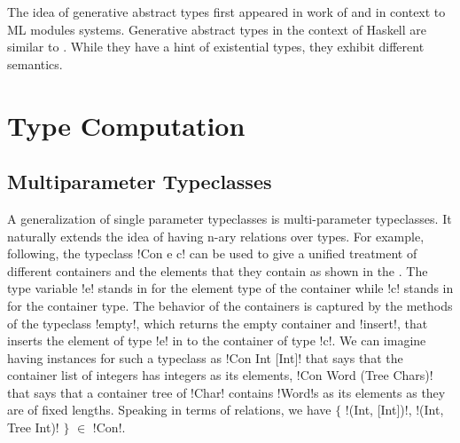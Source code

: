 \documentclass[screen,nonacm,manuscript,review]{acmart} %
\begin{document}
The idea of generative abstract types first appeared in work of
\citet{leroy_applicative_1995} and \citet{milner_definition_1997}
in context to ML modules systems. Generative abstract types in the
context of Haskell are similar to \cite{montagu_modeling_2009}.
While they have a hint of existential types, they exhibit different
semantics.

\section{Type Computation}\label{sec:type-computation}
\subsection{Multiparameter Typeclasses}\label{sec:multiparam-typeclasses}
A generalization of single parameter typeclasses is multi-parameter
typeclasses. It naturally extends the idea of having n-ary relations
over types. For example, following\cite{jones_tcfd_2000}, the
typeclass !Con e c! can be used to give a unified treatment of
different containers and the elements that they contain as shown in
the . The type variable !e! stands in for the
element type of the container while !c! stands in for the container
type. The behavior of the containers is captured by the methods of the
typeclass !empty!, which returns the empty container and !insert!,
that inserts the element of type !e! in to the container of type !c!.
We can imagine having instances for such a typeclass as
!Con Int [Int]! that says that the container list of integers has
integers as its elements, !Con Word (Tree Chars)! that says that a
container tree of !Char! contains !Word!s as its
elements as they are of fixed lengths. Speaking in terms of
relations, we have $\{$ !(Int, [Int])!, !(Int, Tree Int)! $\}$ $\in$ !Con!.
\end{document}
